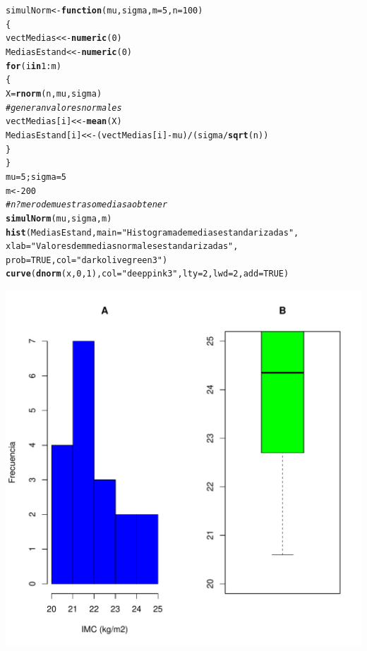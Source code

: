 \documentclass[12pt,letterpaper]{article}\usepackage[]{graphicx}\usepackage[]{color}
\makeatletter
\def\maxwidth{ %
  \ifdim\Gin@nat@width>\linewidth
    \linewidth
  \else
    \Gin@nat@width
  \fi
}
\newcommand{\hlnum}[1]{\textcolor[rgb]{0.686,0.059,0.569}{#1}}%
\newcommand{\hlstr}[1]{\textcolor[rgb]{0.192,0.494,0.8}{#1}}%
\newcommand{\hlcom}[1]{\textcolor[rgb]{0.678,0.584,0.686}{\textit{#1}}}%
\newcommand{\hlopt}[1]{\textcolor[rgb]{0,0,0}{#1}}%
\newcommand{\hlstd}[1]{\textcolor[rgb]{0.345,0.345,0.345}{#1}}%
\newcommand{\hlkwa}[1]{\textcolor[rgb]{0.161,0.373,0.58}{\textbf{#1}}}%
\newcommand{\hlkwb}[1]{\textcolor[rgb]{0.69,0.353,0.396}{#1}}%
\newcommand{\hlkwc}[1]{\textcolor[rgb]{0.333,0.667,0.333}{#1}}%
\newcommand{\hlkwd}[1]{\textcolor[rgb]{0.737,0.353,0.396}{\textbf{#1}}}%
\newenvironment{kframe}{%
 \def\at@end@of@kframe{}%
 \ifinner\ifhmode%
  \def\at@end@of@kframe{\end{minipage}}%
  \begin{minipage}{\columnwidth}%
 \fi\fi%
 \def\FrameCommand##1{\hskip\@totalleftmargin \hskip-\fboxsep
 \colorbox{shadecolor}{##1}\hskip-\fboxsep
     \hskip-\linewidth \hskip-\@totalleftmargin \hskip\columnwidth}%
 \MakeFramed {\advance\hsize-\width
   \@totalleftmargin\z@ \linewidth\hsize
   \@setminipage}}%
 {\par\unskip\endMakeFramed%
 \at@end@of@kframe}
\newenvironment{knitrout}{}{} %
\makeatother
\begin{document}
\begin{enumerate}
\begin{knitrout}
\color{fgcolor}\begin{kframe}
\begin{alltt}
\hlstd{simulNorm} \hlkwb{<-} \hlkwa{function}\hlstd{(}\hlkwc{mu}\hlstd{,}\hlkwc{sigma}\hlstd{,} \hlkwc{m}\hlstd{=}\hlnum{5}\hlstd{,} \hlkwc{n}\hlstd{=}\hlnum{100}\hlstd{)}
\hlstd{\{}
\hlstd{vectMedias} \hlkwb{<<-} \hlkwd{numeric}\hlstd{(}\hlnum{0}\hlstd{)}
\hlstd{MediasEstand} \hlkwb{<<-} \hlkwd{numeric}\hlstd{(}\hlnum{0}\hlstd{)}
\hlkwa{for} \hlstd{(i} \hlkwa{in} \hlnum{1}\hlopt{:}\hlstd{m)}
\hlstd{\{}
\hlstd{X} \hlkwb{=} \hlkwd{rnorm}\hlstd{(n, mu, sigma)}
\hlcom{# genera n valores normales }
\hlstd{vectMedias[i]} \hlkwb{<<-} \hlkwd{mean}\hlstd{(X)}
\hlstd{MediasEstand[i]} \hlkwb{<<-} \hlstd{(vectMedias[i]} \hlopt{-} \hlstd{mu)}\hlopt{/}\hlstd{(sigma}\hlopt{/}\hlkwd{sqrt}\hlstd{(n))}
\hlstd{\}}
\hlstd{\}}
\hlstd{mu}\hlkwb{=}\hlnum{5}\hlstd{; sigma}\hlkwb{=}\hlnum{5}
\hlstd{m} \hlkwb{<-} \hlnum{200}
\hlcom{# n?mero de muestras o medias a obtener }
\hlkwd{simulNorm}\hlstd{(mu, sigma, m)}
\hlkwd{hist}\hlstd{(MediasEstand,} \hlkwc{main}\hlstd{=}\hlstr{"Histograma de medias estandarizadas"}\hlstd{,}
\hlkwc{xlab}\hlstd{=}\hlstr{"Valores de m medias normales estandarizadas"}\hlstd{,}
\hlkwc{prob}\hlstd{=}\hlnum{TRUE}\hlstd{,} \hlkwc{col}\hlstd{=}\hlstr{"darkolivegreen3"}\hlstd{)}
\hlkwd{curve}\hlstd{(}\hlkwd{dnorm}\hlstd{(x,} \hlnum{0}\hlstd{,} \hlnum{1}\hlstd{),} \hlkwc{col} \hlstd{=} \hlstr{"deeppink3"}\hlstd{,} \hlkwc{lty}\hlstd{=}\hlnum{2}\hlstd{,} \hlkwc{lwd}\hlstd{=}\hlnum{2}\hlstd{,} \hlkwc{add}\hlstd{=}\hlnum{TRUE}\hlstd{)}
\end{alltt}
\end{kframe}
\includegraphics[width=\maxwidth]{figure/unnamed-chunk-4-1} 


\end{knitrout}
\end{enumerate}
\end{document}

